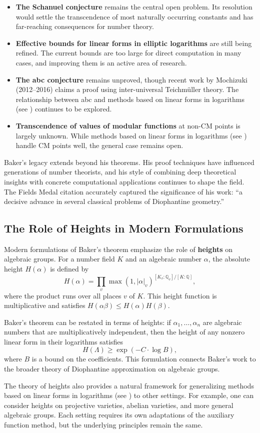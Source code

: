 \begin{itemize}
    \item \textbf{The Schanuel conjecture} remains the central open problem. Its resolution would settle the transcendence of most naturally occurring constants and has far-reaching consequences for number theory.
    \item \textbf{Effective bounds for linear forms in elliptic logarithms} are still being refined. The current bounds are too large for direct computation in many cases, and improving them is an active area of research.
    \item \textbf{The abc conjecture} remains unproved, though recent work by Mochizuki (2012--2016) claims a proof using inter-universal Teichmüller theory. The relationship between abc and methods based on linear forms in logarithms (see \cite{baker1966}) continues to be explored.
    \item \textbf{Transcendence of values of modular functions} at non-CM points is largely unknown. While methods based on linear forms in logarithms (see \cite{baker1966}) handle CM points well, the general case remains open.
\end{itemize}

Baker's legacy extends beyond his theorems. His proof techniques have influenced generations of number theorists, and his style of combining deep theoretical insights with concrete computational applications continues to shape the field. The Fields Medal citation accurately captured the significance of his work: ``a decisive advance in several classical problems of Diophantine geometry.''

\subsection*{The Role of Heights in Modern Formulations}

Modern formulations of Baker's theorem emphasize the role of \textbf{heights} on algebraic groups. For a number field $K$ and an algebraic number $\alpha$, the absolute height $H(\alpha)$ is defined by
\[
H(\alpha) = \prod_v \max(1, |\alpha|_v)^{[K_v:\mathbb{Q}_v]/[K:\mathbb{Q}]},
\]
where the product runs over all places $v$ of $K$. This height function is multiplicative and satisfies $H(\alpha\beta) \leq H(\alpha)H(\beta)$.

Baker's theorem can be restated in terms of heights: if $\alpha_1, \ldots, \alpha_n$ are algebraic numbers that are multiplicatively independent, then the height of any nonzero linear form in their logarithms satisfies
\[
H(\Lambda) \geq \exp(-C \cdot \log B),
\]
where $B$ is a bound on the coefficients. This formulation connects Baker's work to the broader theory of Diophantine approximation on algebraic groups.

The theory of heights also provides a natural framework for generalizing methods based on linear forms in logarithms (see \cite{baker1966}) to other settings. For example, one can consider heights on projective varieties, abelian varieties, and more general algebraic groups. Each setting requires its own adaptations of the auxiliary function method, but the underlying principles remain the same.
